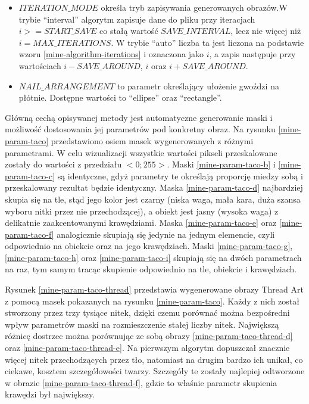 \begin{itemize}
        \item \(ITERATION\_MODE\) określa tryb zapisywania generowanych obrazów.\linebreak W trybie ``interval'' algorytm zapisuje dane do pliku przy iteracjach\linebreak \(i >= START\_SAVE\) co stałą wartość \(SAVE\_INTERVAL\), lecz nie więcej niż \(i = MAX\_ITERATIONS\). W trybie ``auto'' liczba ta jest liczona na podstawie wzoru \ref{mine-algorithm-iterations} i oznaczona jako \(i\), a zapis następuje przy wartościach \(i - SAVE\_AROUND\), \(i\) oraz \(i + SAVE\_AROUND\).
        \item \(NAIL\_ARRANGEMENT\) to parametr określający ułożenie gwoździ na płótnie. Dostępne wartości to ``ellipse'' oraz ``rectangle''.
    \end{itemize}
    
    Główną cechą opisywanej metody jest automatyczne generowanie maski i możliwość dostosowania jej parametrów pod konkretny obraz. Na rysunku \ref{mine-param-taco} przedstawiono osiem masek wygenerowanych z różnymi parametrami. W celu wizualizacji wszystkie wartości pikseli przeskalowane zostały do wartości z przedziału \(<0;255>\). Maski \ref{mine-param-taco-b} i \ref{mine-param-taco-c} są identyczne, gdyż parametry te określają proporcję miedzy sobą i przeskalowany rezultat będzie identyczny. Maska \ref{mine-param-taco-d} najbardziej skupia się na tle, stąd jego kolor jest czarny (niska waga, mała kara, duża szansa wyboru nitki przez nie przechodzącej), a obiekt jest jasny (wysoka waga) z delikatnie zaakcentowanymi krawędziami. Maska \ref{mine-param-taco-e} oraz \ref{mine-param-taco-f} analogicznie skupiają się jedynie na jednym elemencie, czyli odpowiednio na obiekcie oraz na jego krawędziach. Maski \ref{mine-param-taco-g}, \ref{mine-param-taco-h} oraz \ref{mine-param-taco-i} skupiają się na dwóch parametrach na raz, tym samym tracąc skupienie odpowiednio na tle, obiekcie i krawędziach.
    
    Rysunek \ref{mine-param-taco-thread} przedstawia wygenerowane obrazy Thread Art z pomocą masek pokazanych na rysunku \ref{mine-param-taco}. Każdy z nich został stworzony przez trzy tysiące nitek, dzięki czemu porównać można bezpośredni wpływ parametrów maski na rozmieszczenie stałej liczby nitek. Największą różnicę dostrzec można porównując ze sobą obrazy \ref{mine-param-taco-thread-d} oraz \ref{mine-param-taco-thread-e}. Na pierwszym algorytm dopuszczał znacznie więcej nitek przechodzących przez tło, natomiast na drugim bardzo ich unikał, co ciekawe, kosztem szczegółowości twarzy. Szczegóły te zostały najlepiej odtworzone w obrazie \ref{mine-param-taco-thread-f}, gdzie to właśnie parametr skupienia krawędzi był największy.

